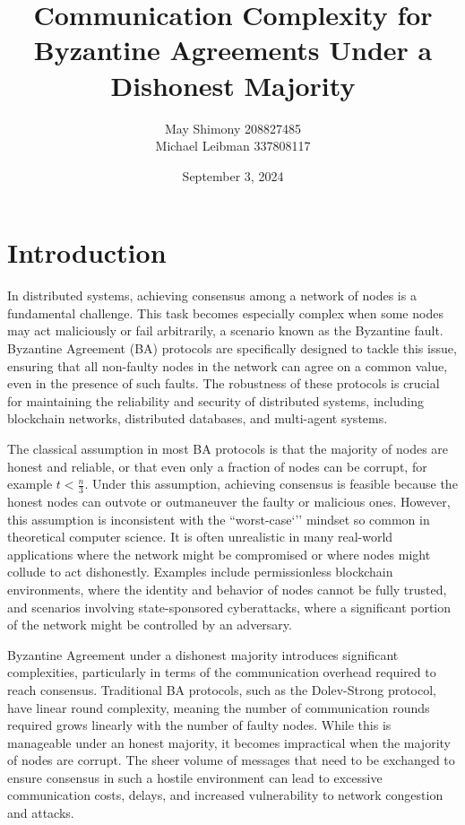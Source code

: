 \documentclass[11pt]{article}
\title{Communication Complexity for Byzantine Agreements Under a Dishonest Majority}
\author{May Shimony 208827485\\
Michael Leibman 337808117}
\date{September 3, 2024}
\begin{document}
    \maketitle
	
\section{Introduction}	
In distributed systems, achieving consensus among a network of nodes is a fundamental challenge. This task becomes especially complex when some nodes may act maliciously or fail arbitrarily, a scenario known as the Byzantine fault. Byzantine Agreement (BA) protocols are specifically designed to tackle this issue, ensuring that all non-faulty nodes in the network can agree on a common value, even in the presence of such faults. The robustness of these protocols is crucial for maintaining the reliability and security of distributed systems, including blockchain networks, distributed databases, and multi-agent systems.

The classical assumption in most BA protocols is that the majority of nodes are honest and reliable, or that even only a fraction of nodes can be corrupt, for example $t < \frac{n}{3}$. Under this assumption, achieving consensus is feasible because the honest nodes can outvote or outmaneuver the faulty or malicious ones. However, this assumption is inconsistent with the ``worst-case`'' mindset so common in theoretical computer science. It is often unrealistic in many real-world applications where the network might be compromised or where nodes might collude to act dishonestly. Examples include permissionless blockchain environments, where the identity and behavior of nodes cannot be fully trusted, and scenarios involving state-sponsored cyberattacks, where a significant portion of the network might be controlled by an adversary.

Byzantine Agreement under a dishonest majority introduces significant complexities, particularly in terms of the communication overhead required to reach consensus. Traditional BA protocols, such as the Dolev-Strong protocol, have linear round complexity, meaning the number of communication rounds required grows linearly with the number of faulty nodes. While this is manageable under an honest majority, it becomes impractical when the majority of nodes are corrupt. The sheer volume of messages that need to be exchanged to ensure consensus in such a hostile environment can lead to excessive communication costs, delays, and increased vulnerability to network congestion and attacks.
\end{document}
